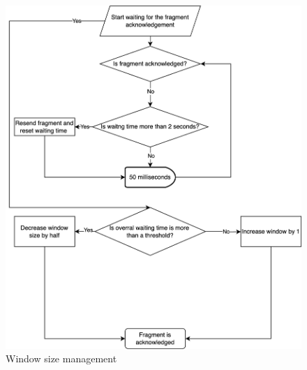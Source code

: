 \documentclass{article}
\begin{document}
\begin{figure}[!h]
    \centering
    \includegraphics[width=\textwidth]{images/windowmanage.png}
    \caption{Window size management}
    \label{fig:mesh2}
\end{figure}
\end{document}

